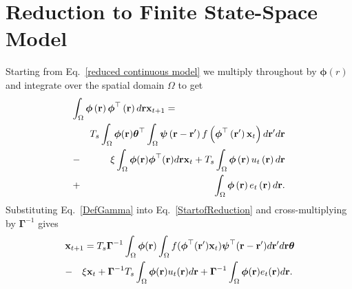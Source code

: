 \documentclass[twocolumn,11pt,a4paper]{article}		%
\begin{document}
\section{Reduction to Finite State-Space Model}\label{Simplifying Decomposition} Starting from Eq.~\ref{reduced continuous model} we multiply throughout by $\boldsymbol{\phi}(r)$ and integrate over the spatial domain $\Omega$ to get 
\begin{eqnarray}
	\label{StartofReduction}\lefteqn{ \int_\Omega {\boldsymbol{\phi} \left(\mathbf{r}\right)\boldsymbol{\phi}^{\top}\left(\mathbf{r}\right) d\mathbf{r}} \mathbf{x}_{t+1}=} \nonumber\\
 &&T_s \int_\Omega {\boldsymbol{\phi} (\mathbf{r}) \boldsymbol{\theta}^{\top} \int_\Omega {\boldsymbol{\psi} \left(\mathbf{r}-\mathbf{r}'\right) f\left(\boldsymbol{\phi}^{\top}\left(\mathbf{r}'\right) \mathbf{x}_t \right)d\mathbf{r}'}d\mathbf{r}} \nonumber\\
&-& \xi\int_\Omega {\boldsymbol{\phi}(\mathbf{r})\boldsymbol{\phi}^{\top}(\mathbf{r})d\mathbf{r}} \mathbf{x}_t+T_s \int_\Omega{\boldsymbol{\phi} \left(\mathbf{r}\right) u_t\left(\mathbf{r}\right)d\mathbf{r}}\nonumber\\
&+&\int_\Omega{\boldsymbol{\phi} \left(\mathbf{r}\right) e_t\left(\mathbf{r}\right)d\mathbf{r}}. 
\end{eqnarray}
Substituting Eq.~\ref{DefGamma} into Eq.~\ref{StartofReduction} and cross-multiplying by $\boldsymbol{\Gamma}^{-1}$ gives 
\begin{eqnarray}\label{eq:ReducedForm}
	 \lefteqn{\mathbf{x}_{t+1} \nonumber= T_s\boldsymbol{\Gamma}^{ - 1}\int_\Omega {\boldsymbol{\phi}(\mathbf{r}) \int_\Omega {f(\boldsymbol{\phi}^{\top}(\mathbf{r}')\mathbf{x}_t) \boldsymbol{\psi}^{\top} (\mathbf{r}-\mathbf{r}')d\mathbf{r}'} d\mathbf{r}} \boldsymbol{\theta}} \nonumber\\
&-&\xi\mathbf{x}_t+\boldsymbol{\Gamma}^{-1}T_s\int_\Omega{\boldsymbol{\phi}(\mathbf{r}) u_t(\mathbf{r})d\mathbf{r}}\nonumber+\boldsymbol{\Gamma}^{-1} \int_\Omega{\boldsymbol{\phi}(\mathbf{r})e_t(\mathbf{r})d\mathbf{r}}.\\ 
\end{eqnarray}
\end{document}
